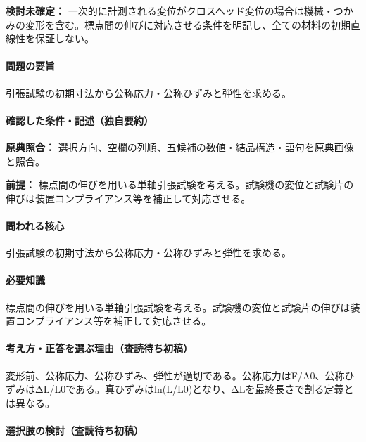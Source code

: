 \par\textbf{検討未確定：} 一次的に計測される変位がクロスヘッド変位の場合は機械・つかみの変形を含む。標点間の伸びに対応させる条件を明記し、全ての材料の初期直線性を保証しない。

\paragraph{問題の要旨} 引張試験の初期寸法から公称応力・公称ひずみと弾性を求める。

\paragraph{確認した条件・記述（独自要約）}\mbox{}\par

\noindent\textbf{原典照合：} 選択方向、空欄の列順、五候補の数値・結晶構造・語句を原典画像と照合。\par

\noindent\textbf{前提：} 標点間の伸びを用いる単軸引張試験を考える。試験機の変位と試験片の伸びは装置コンプライアンス等を補正して対応させる。\par

\paragraph{問われる核心} 引張試験の初期寸法から公称応力・公称ひずみと弾性を求める。

\paragraph{必要知識} 標点間の伸びを用いる単軸引張試験を考える。試験機の変位と試験片の伸びは装置コンプライアンス等を補正して対応させる。

\paragraph{考え方・正答を選ぶ理由（査読待ち初稿）} 変形前、公称応力、公称ひずみ、弾性が適切である。公称応力はF/A0、公称ひずみはΔL/L0である。真ひずみはln(L/L0)となり、ΔLを最終長さで割る定義とは異なる。

\paragraph{選択肢の検討（査読待ち初稿）}\mbox{}\par

